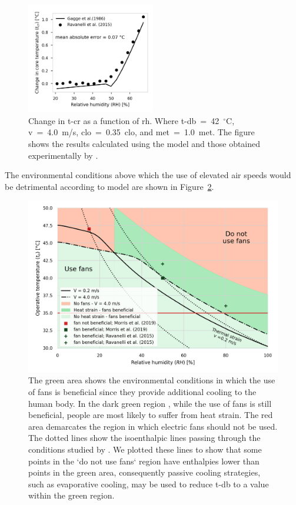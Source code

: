 \begin{figure}[thb!]
    \centering
    \includegraphics[width=0.5\textwidth]{figures/comparison_ravanelli}
    \caption{Change in \acf{t-cr} as a function of \acf{rh}.
    Where \ac{t-db}~=~42~$^{\circ}$C, \ac{v}~=~4.0~m/s, \ac{clo}~=~0.35~clo, and \ac{met}~=~1.0~met.
    The figure shows the results calculated using the  model and those obtained experimentally by .}
    \label{fig:comparison_ravanelli}
\end{figure}

The environmental conditions above which the use of elevated air speeds would be detrimental according to  model are shown in Figure~\ref{fig:use_fans_experimental}.

\begin{figure}[thb!]
    \centering
    \includegraphics[width=\textwidth]{figures/summary_use_fans_comparison_experimental}
    \caption{The green area shows the environmental conditions in which the use of fans is beneficial since they provide additional cooling to the human body.
    In the dark green region , while the use of fans is still beneficial, people are most likely to suffer from heat strain.
    The red area demarcates the region in which electric fans should not be used.
    The dotted lines show the isoenthalpic lines passing through the conditions studied by .
    We plotted these lines to show that some points in the `do not use fans` region have enthalpies lower than points in the green area, consequently passive cooling strategies, such as evaporative cooling, may be used to reduce \ac{t-db} to a value within the green region.
    }
    \label{fig:use_fans_experimental}
\end{figure}

